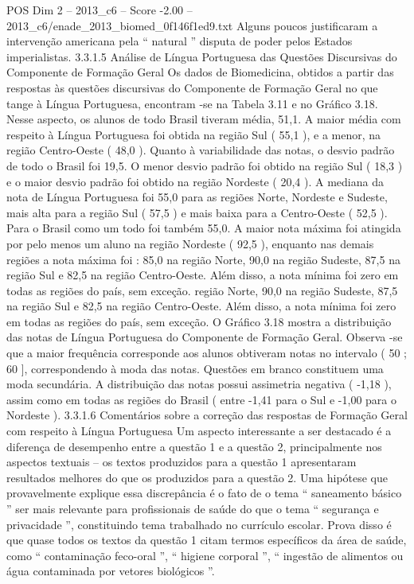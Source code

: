 \begin{textsample}{POS Dim 2 – 2013\_c6 – Score -2.00 – 2013\_c6/enade\_2013\_biomed\_0f146f1ed9.txt}
Alguns poucos justificaram a intervenção americana pela “ natural ” disputa de poder pelos Estados imperialistas. 3.3.1.5 Análise de Língua Portuguesa das Questões Discursivas do Componente de Formação Geral Os dados de Biomedicina, obtidos a partir das respostas às questões discursivas do Componente de Formação Geral no que tange à Língua Portuguesa, encontram -se na Tabela 3.11 e no Gráfico 3.18.
Nesse aspecto, os alunos de todo Brasil tiveram média, 51,1.
A maior média com respeito à Língua Portuguesa foi obtida na região Sul ( 55,1 ), e a menor, na região Centro-Oeste ( 48,0 ).
Quanto à variabilidade das notas, o desvio padrão de todo o Brasil foi 19,5.
O menor desvio padrão foi obtido na região Sul ( 18,3 ) e o maior desvio padrão foi obtido na região Nordeste ( 20,4 ).
A mediana da nota de Língua Portuguesa foi 55,0 para as regiões Norte, Nordeste e Sudeste, mais alta para a região Sul ( 57,5 ) e mais baixa para a Centro-Oeste ( 52,5 ).
Para o Brasil como um todo foi também 55,0.
A maior nota máxima foi atingida por pelo menos um aluno na região Nordeste ( 92,5 ), enquanto nas demais regiões a nota máxima foi : 85,0 na região Norte, 90,0 na região Sudeste, 87,5 na região Sul e 82,5 na região Centro-Oeste.
Além disso, a nota mínima foi zero em todas as regiões do país, sem exceção. região Norte, 90,0 na região Sudeste, 87,5 na região Sul e 82,5 na região Centro-Oeste.
Além disso, a nota mínima foi zero em todas as regiões do país, sem exceção.
O Gráfico 3.18 mostra a distribuição das notas de Língua Portuguesa do Componente de Formação Geral.
Observa -se que a maior frequência corresponde aos alunos obtiveram notas no intervalo ( 50 ; 60 ], correspondendo à moda das notas.
Questões em branco constituem uma moda secundária.
A distribuição das notas possui assimetria negativa ( -1,18 ), assim como em todas as regiões do Brasil ( entre -1,41 para o Sul e -1,00 para o Nordeste ). 3.3.1.6 Comentários sobre a correção das respostas de Formação Geral com respeito à Língua Portuguesa Um aspecto interessante a ser destacado é a diferença de desempenho entre a questão 1 e a questão 2, principalmente nos aspectos textuais – os textos produzidos para a questão 1 apresentaram resultados melhores do que os produzidos para a questão 2.
Uma hipótese que provavelmente explique essa discrepância é o fato de o tema “ saneamento básico ” ser mais relevante para profissionais de saúde do que o tema “ segurança e privacidade ”, constituindo tema trabalhado no currículo escolar.
Prova disso é que quase todos os textos da questão 1 citam termos específicos da área de saúde, como “ contaminação feco-oral ”, “ higiene corporal ”, “ ingestão de alimentos ou água contaminada por vetores biológicos ”.

\end{textsample}
